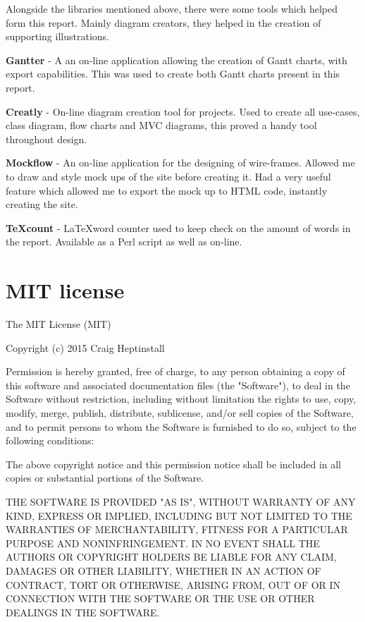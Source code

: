 Alongside the libraries mentioned above, there were some tools which helped form this report. Mainly diagram creators, they helped in the creation of supporting illustrations.

\textbf{Gantter} - A an on-line application allowing the creation of Gantt charts, with export capabilities. This was used to create both Gantt charts present in this report.

\textbf{Creatly} - On-line diagram creation tool for projects. Used to create all use-cases, class diagram, flow charts and MVC diagrams, this proved a handy tool throughout design.

\textbf{Mockflow} - An on-line application for the designing of wire-frames. Allowed me to draw and style mock ups of the site before creating it. Had a very useful feature which allowed me to export the mock up to HTML code, instantly creating the site.

\textbf{TeXcount} - \LaTeX word counter used to keep check on the amount of words in the report. Available as a Perl script as well as on-line.

\section{MIT license}
The MIT License (MIT)

Copyright (c) 2015 Craig Heptinstall

Permission is hereby granted, free of charge, to any person obtaining a copy
of this software and associated documentation files (the "Software"), to deal
in the Software without restriction, including without limitation the rights
to use, copy, modify, merge, publish, distribute, sublicense, and/or sell
copies of the Software, and to permit persons to whom the Software is
furnished to do so, subject to the following conditions:

The above copyright notice and this permission notice shall be included in
all copies or substantial portions of the Software.

THE SOFTWARE IS PROVIDED "AS IS", WITHOUT WARRANTY OF ANY KIND, EXPRESS OR
IMPLIED, INCLUDING BUT NOT LIMITED TO THE WARRANTIES OF MERCHANTABILITY,
FITNESS FOR A PARTICULAR PURPOSE AND NONINFRINGEMENT. IN NO EVENT SHALL THE
AUTHORS OR COPYRIGHT HOLDERS BE LIABLE FOR ANY CLAIM, DAMAGES OR OTHER
LIABILITY, WHETHER IN AN ACTION OF CONTRACT, TORT OR OTHERWISE, ARISING FROM,
OUT OF OR IN CONNECTION WITH THE SOFTWARE OR THE USE OR OTHER DEALINGS IN
THE SOFTWARE.